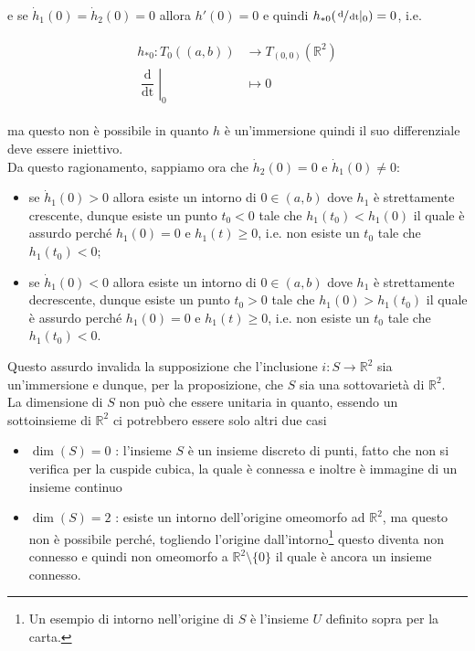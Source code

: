 e se $ \dot{h}_{1}(0) = \dot{h}_{2}(0) = 0 $ allora $ h'(0) = 0 $ e quindi $ h_{*0} (\sfrac{\operatorname{d}}{\operatorname{dt}} |_{0} ) = 0 $, i.e.

\begin{align}
	\begin{split}
		h_{*0} : T_{0}((a,b)) &\to T_{(0,0)}(\mathbb{R}^{2})\\
		\left. \dfrac{\operatorname{d}}{\operatorname{dt}} \right|_{0} &\mapsto 0
	\end{split}
\end{align}

ma questo non è possibile in quanto $ h $ è un'immersione quindi il suo differenziale deve essere iniettivo.\\
Da questo ragionamento, sappiamo ora che $ \dot{h}_{2}(0)=0 $ e $ \dot{h}_{1}(0) \neq 0 $:

\begin{itemize}
	\item se $ \dot{h}_{1}(0) > 0 $ allora esiste un intorno di $ 0 \in (a,b) $ dove $ h_{1} $ è strettamente crescente, dunque esiste un punto $ t_{0}<0 $ tale che $ h_{1}(t_{0}) < h_{1}(0) $ il quale è assurdo perché $ h_{1}(0) = 0 $ e $ h_{1}(t) \geqslant 0 $, i.e. non esiste un $ t_{0} $ tale che $ h_{1}(t_{0}) < 0 $;
	
	\item se $ \dot{h}_{1}(0) < 0 $ allora esiste un intorno di $ 0 \in (a,b) $ dove $ h_{1} $ è strettamente decrescente, dunque esiste un punto $ t_{0}>0 $ tale che $ h_{1}(0) > h_{1}(t_{0}) $ il quale è assurdo perché $ h_{1}(0) = 0 $ e $ h_{1}(t) \geqslant 0 $, i.e. non esiste un $ t_{0} $ tale che $ h_{1}(t_{0}) < 0 $.
\end{itemize}

Questo assurdo invalida la supposizione che l'inclusione $ i : S \to \mathbb{R}^{2} $ sia un'immersione e dunque, per la proposizione, che $ S $ sia una sottovarietà di $ \mathbb{R}^{2} $.\\
La dimensione di $ S $ non può che essere unitaria in quanto, essendo un sottoinsieme di $ \mathbb{R}^{2} $ ci potrebbero essere solo altri due casi

\begin{itemize}
	\item $ \dim(S)=0 $ : l'insieme $ S $ è un insieme discreto di punti, fatto che non si verifica per la cuspide cubica, la quale è connessa e inoltre è immagine di un insieme continuo
	
	\item $ \dim(S)=2 $ : esiste un intorno dell'origine omeomorfo ad $ \mathbb{R}^{2} $, ma questo non è possibile perché, togliendo l'origine dall'intorno\footnote{%
		Un esempio di intorno nell'origine di $ S $ è l'insieme $ U $ definito sopra per la carta.%
	} questo diventa non connesso e quindi non omeomorfo a $ \mathbb{R}^{2} \setminus \{0\} $ il quale è ancora un insieme connesso.
\end{itemize}

